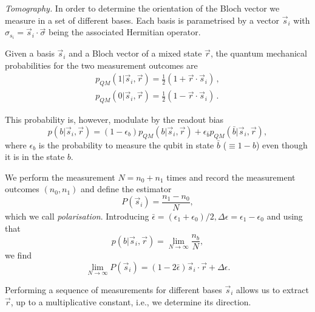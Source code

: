 \documentclass[a4paper,twocolumn,11pt]{quantumarticle}
\begin{document}
\emph{Tomography.} In order to determine the orientation of the Bloch vector we measure in a set of different bases. Each basis is parametrised by a vector $\vec{s}_i$ with $\sigma_{s_i} = \vec{s}_i \cdot \vec{\sigma}$ being the associated Hermitian operator.

Given a basis $\vec{s}_i$ and a Bloch vector of a mixed state $\vec{r}$, the quantum mechanical probabilities for the two measurement outcomes are
\begin{equation}\label{eqn:probs}
\begin{split}
p_{QM}(1|\vec{s}_i, \vec{r}) = \frac{1}{2}(1+\vec{r}\cdot\vec{s}_i)\,,\\
p_{QM}(0|\vec{s}_i, \vec{r}) = \frac{1}{2}(1-\vec{r}\cdot\vec{s}_i)\,.
\end{split}
\end{equation}

This probability is, however, modulate by the readout bias
\begin{equation}
    p(b|\vec{s}_i, \vec{r}) = (1-\epsilon_b)p_{QM}(b|\vec{s}_i, \vec{r}) + \epsilon_{\bar{b}} p_{QM}(\bar{b}|\vec{s}_i, \vec{r}), \label{eqn:marg}
\end{equation}
where $\epsilon_b$ is the probability to measure the qubit in state $\bar{b}$ ($\equiv 1-b$) even though it is in the state $b$.



We perform the measurement $N=n_0 + n_1$ times and record the measurement outcomes $(n_0, n_1)$ and define the estimator 
\begin{equation}
    P(\vec{s}_i) = \frac{n_1-n_0}{N},
\end{equation}
which we call \emph{polarisation}.
Introducing $\bar \epsilon = (\epsilon_1+\epsilon_0)/2, \Delta \epsilon = \epsilon_1-\epsilon_0$ and using that 
$$p(b|\vec{s}_i, \vec{r})=\lim_{N\to \infty} \frac{n_b}{N},$$
we find \begin{equation}
\lim_{N \to \infty} P(\vec{s}_i)=(1-2\bar\epsilon)\vec{s}_i \cdot \vec{r} + \Delta\epsilon.\label{eqn:estim}
\end{equation}
 
Performing a sequence of measurements for different bases $\vec{s}_i$ allows us to extract $\vec{r}$, up to a multiplicative constant, i.e., we determine its direction.
\end{document}
